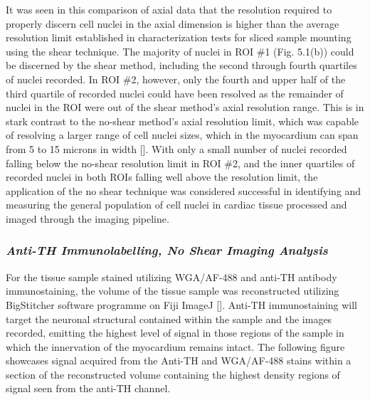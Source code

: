 It was seen in this comparison of axial data that the resolution required to properly discern cell nuclei in the axial dimension is higher than the average resolution limit established in characterization tests for sliced sample mounting using the shear technique. The majority of nuclei in ROI \#1 (Fig. 5.1(b)) could be discerned by the shear method, including the second through fourth quartiles of nuclei recorded. In ROI \#2, however, only the fourth and upper half of the third quartile of recorded nuclei could have been resolved as the remainder of nuclei in the ROI were out of the shear method's axial resolution range. This is in stark contrast to the no-shear method's axial resolution limit, which was capable of resolving a larger range of cell nuclei sizes, which in the myocardium can span from 5 to 15 microns in width []. With only a small number of nuclei recorded falling below the no-shear resolution limit in ROI \#2, and the inner quartiles of recorded nuclei in both ROIs falling well above the resolution limit, the application of the no shear technique was considered successful in identifying and measuring the general population of cell nuclei in cardiac tissue processed and imaged through the imaging pipeline.

\subsubsection{\textit{Anti-TH Immunolabelling, No Shear Imaging Analysis}}

For the tissue sample stained utilizing WGA/AF-488 and anti-TH antibody immunostaining, the volume of the tissue sample was reconstructed utilizing BigStitcher software programme on Fiji ImageJ []. Anti-TH immunostaining will target the neuronal structural contained within the sample and the images recorded, emitting the highest level of signal in those regions of the sample in which the innervation of the myocardium remains intact. The following figure showcases signal acquired from the Anti-TH and WGA/AF-488 stains within a section of the reconstructed volume containing the highest density regions of signal seen from the anti-TH channel.  

